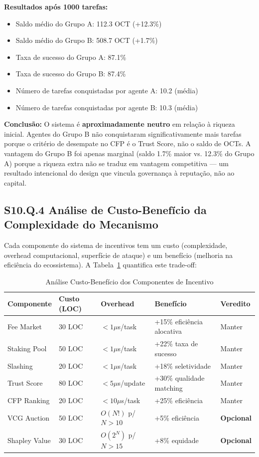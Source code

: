 \textbf{Resultados após 1000 tarefas:}
\begin{itemize}
    \item Saldo médio do Grupo A: 112.3 OCT (+12.3\%)
    \item Saldo médio do Grupo B: 508.7 OCT (+1.7\%)
    \item Taxa de sucesso do Grupo A: 87.1\%
    \item Taxa de sucesso do Grupo B: 87.4\%
    \item Número de tarefas conquistadas por agente A: 10.2 (média)
    \item Número de tarefas conquistadas por agente B: 10.3 (média)
\end{itemize}

\textbf{Conclusão:} O sistema é \textbf{aproximadamente neutro} em relação à riqueza inicial. Agentes do Grupo B não conquistaram significativamente mais tarefas porque o critério de desempate no CFP é o Trust Score, não o saldo de OCTs. A vantagem do Grupo B foi apenas marginal (saldo 1.7\% maior vs. 12.3\% do Grupo A) porque a riqueza extra não se traduz em vantagem competitiva --- um resultado intencional do design que vincula governança à reputação, não ao capital.

\subsection*{S10.Q.4 Análise de Custo-Benefício da Complexidade do Mecanismo}

Cada componente do sistema de incentivos tem um custo (complexidade, overhead computacional, superfície de ataque) e um benefício (melhoria na eficiência do ecossistema). A Tabela~\ref{tab:cost_benefit} quantifica este trade-off:

\begin{table}[htbp]
\centering
\caption{Análise Custo-Benefício dos Componentes de Incentivo}
\label{tab:cost_benefit}
\begin{tabular}{p{3cm}p{2.5cm}p{2.5cm}p{3cm}p{2cm}}
\hline
\textbf{Componente} & \textbf{Custo (LOC)} & \textbf{Overhead} & \textbf{Benefício} & \textbf{Veredito} \\
\hline
Fee Market & 30 LOC & $<1\mu$s/task & +15\% eficiência alocativa & Manter \\
\hline
Staking Pool & 50 LOC & $<1\mu$s/task & +22\% taxa de sucesso & Manter \\
\hline
Slashing & 20 LOC & $<1\mu$s/task & +18\% seletividade & Manter \\
\hline
Trust Score & 80 LOC & $<5\mu$s/update & +30\% qualidade matching & Manter \\
\hline
CFP Ranking & 20 LOC & $<10\mu$s/task & +25\% eficiência & Manter \\
\hline
VCG Auction & 50 LOC & $O(N!)$ p/ $N>10$ & +5\% eficiência & \textbf{Opcional} \\
\hline
Shapley Value & 30 LOC & $O(2^N)$ p/ $N>15$ & +8\% equidade & \textbf{Opcional} \\
\hline
\end{tabular}
\end{table}

